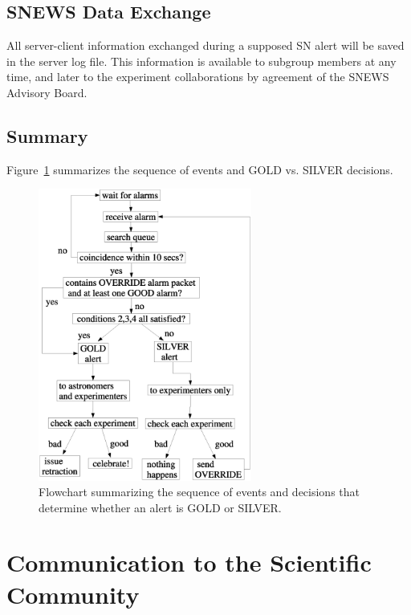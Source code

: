 \documentclass{article}
\begin{document}
\subsection{SNEWS Data Exchange}

All server-client information
exchanged during a supposed SN alert will be saved
in the server log file. This information is available to subgroup
members at any time, and later to the experiment collaborations
by agreement of the SNEWS Advisory Board.


\subsection{Summary}

Figure~\ref{fig:flowchart} summarizes the sequence of events 
and GOLD vs. SILVER decisions.

\begin{figure}[htbp]
\begin{center}
\includegraphics[width=7cm, bb= 40 120 539 820]{flowchart.eps}
\caption{\label{fig:flowchart} Flowchart summarizing the 
sequence of events and decisions that determine whether an
alert is GOLD or SILVER.}
\end{center}
\end{figure}



\section{Communication to the Scientific Community}
\end{document}

